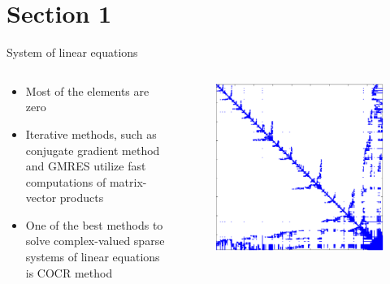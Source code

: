 \documentclass[mathserif,12pt,handout,notes=show]{beamer}
\begin{document}
\section{Section 1}

\begin{frame}{System of linear equations}

    \begin{columns}
        \begin{column}{0.6\textwidth}
            \begin{itemize}
                \item Most of the elements are zero
                \item Iterative methods, such as conjugate gradient method
                      and GMRES utilize fast computations of matrix-vector products
                \item One of the best methods to solve complex-valued
                      sparse systems of linear equations is COCR method
            \end{itemize}
        \end{column}
        \begin{column}{0.4\textwidth}
            \begin{figure}
                \centering
                \includegraphics[width=\textwidth]{sparse-matrix}    
            \end{figure}
        \end{column}
    \end{columns}
    
\end{frame}
\note{
    \lipsum[1]
}
\end{document}
